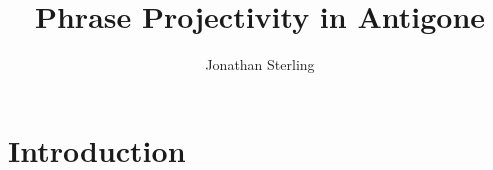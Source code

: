 \documentclass{article}
\newcommand{\Varid}[1]{\mathit{#1}}
\def\resethooks{%
  \global\let\SaveRestoreHook\empty
  \global\let\ColumnHook\empty}
\let\hspre\empty
\let\hspost\empty
\newcommand\VarId[1]{\mathord{\textcolor{VarId}{#1}}}
\let\Varid\VarId
\newcommand\VarSym[1]{\mathbin{\textcolor{VarSym}{#1}}}
\newcommand{\FN}{\mathsf}
\newcommand{\ignore}[1]{}
\begin{document}
\author{Jonathan Sterling}

\title{Phrase Projectivity in Antigone}
\maketitle

\ignore{
\begin{hscode}\SaveRestoreHook
\column{B}{@{}>{\hspre}l<{\hspost}@{}}%
\column{3}{@{}>{\hspre}l<{\hspost}@{}}%
\column{E}{@{}>{\hspre}l<{\hspost}@{}}%
\>[3]{}\mathkw{module}\;\mathsf{Holes}\;\mathkw{where}{}\<[E]%
\\
\>[3]{}\mathkw{import}\;\mathsf{\mathsf{Control}.Applicative}{}\<[E]%
\\
\>[3]{}\mathkw{import}\;\mathsf{\mathsf{Control}.Arrow}\;((\VarSym{\&\&\&})){}\<[E]%
\\
\>[3]{}\mathkw{import}\;\mathsf{\mathsf{Data}.Foldable}{}\<[E]%
\\
\>[3]{}\mathkw{import}\;\mathsf{\mathsf{Data}.Monoid}{}\<[E]%
\\
\>[3]{}\mathkw{import}\;\mathsf{Prelude}\;\Varid{hiding}\;(\FN{maximum},\FN{minimum},\FN{foldl},\cdot \notin\cdot ){}\<[E]%
\ColumnHook
\end{hscode}\resethooks
}

\section{Introduction}
\label{sec:introduction}
\end{document}
